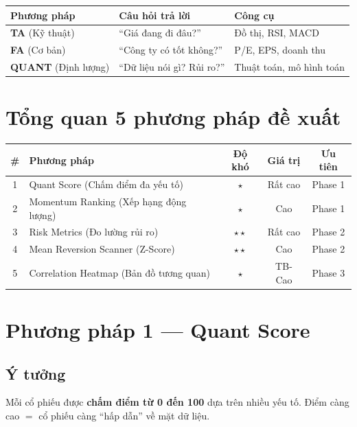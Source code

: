 \documentclass[12pt,a4paper]{article}
\begin{document}
\vspace{0.5cm}

\begin{tabularx}{\textwidth}{l l X}
\toprule
\textbf{Phương pháp} & \textbf{Câu hỏi trả lời} & \textbf{Công cụ} \\
\midrule
\textbf{TA} (Kỹ thuật) & ``Giá đang đi đâu?'' & Đồ thị, RSI, MACD \\
\textbf{FA} (Cơ bản) & ``Công ty có tốt không?'' & P/E, EPS, doanh thu \\
\textbf{QUANT} (Định lượng) & ``Dữ liệu nói gì? Rủi ro?'' & Thuật toán, mô hình toán \\
\bottomrule
\end{tabularx}

\section{Tổng quan 5 phương pháp đề xuất}

\begin{tabularx}{\textwidth}{c l c c c}
\toprule
\textbf{\#} & \textbf{Phương pháp} & \textbf{Độ khó} & \textbf{Giá trị} & \textbf{Ưu tiên} \\
\midrule
1 & Quant Score (Chấm điểm đa yếu tố) & $\star$ & Rất cao & Phase 1 \\
2 & Momentum Ranking (Xếp hạng động lượng) & $\star$ & Cao & Phase 1 \\
3 & Risk Metrics (Đo lường rủi ro) & $\star\star$ & Rất cao & Phase 2 \\
4 & Mean Reversion Scanner (Z-Score) & $\star\star$ & Cao & Phase 2 \\
5 & Correlation Heatmap (Bản đồ tương quan) & $\star$ & TB-Cao & Phase 3 \\
\bottomrule
\end{tabularx}

\newpage
\section{Phương pháp 1 — Quant Score}

\subsection{Ý tưởng}
Mỗi cổ phiếu được \textbf{chấm điểm từ 0 đến 100} dựa trên nhiều yếu tố. Điểm càng cao $=$ cổ phiếu càng ``hấp dẫn'' về mặt dữ liệu.
\end{document}
